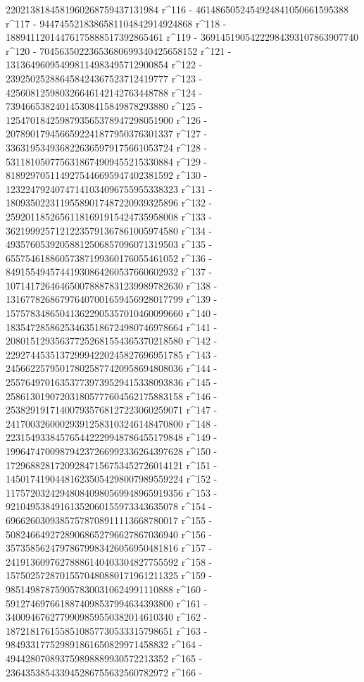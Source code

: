        2202138184581960268759437131984 r^116 - 
       4614865052454924841050661595388 r^117 - 
       9447455218386581104842914924868 r^118 - 
       18894112014476175888517392865461 r^119 - 
       36914519054222984393107863907740 r^120 - 
       70456350223653680699340425658152 r^121 - 
       131364960954998114983495712900854 r^122 - 
       239250252886458424367523712419777 r^123 - 
       425608125980326646142142763448788 r^124 - 
       739466538240145308415849878293880 r^125 - 
       1254701842598793565378947298051900 r^126 - 
       2078901794566592241877950376301337 r^127 - 
       3363195349368226365979175661053724 r^128 - 
       5311810507756318674909455215330884 r^129 - 
       8189297051149275446695947402381592 r^130 - 
       12322479240747141034096755955338323 r^131 - 
       18093502231195589017487220939325896 r^132 - 
       25920118526561181691915424735958008 r^133 - 
       36219992571212235791367861005974580 r^134 - 
       49357605392058812506857096071319503 r^135 - 
       65575461886057387199360176055461052 r^136 - 
       84915549457441930864260537660602932 r^137 - 
       107141726464650078887831239989782630 r^138 - 
       131677826867976407001659456928017799 r^139 - 
       157578348650413622905357010460099660 r^140 - 
       183547285862534635186724980746978664 r^141 - 
       208015129356377252681554365370218580 r^142 - 
       229274453513729994220245827696951785 r^143 - 
       245662257950178025877420958694808036 r^144 - 
       255764970163537739739529415338093836 r^145 - 
       258613019072031805777604562175883158 r^146 - 
       253829191714007935768127223060259071 r^147 - 
       241700326000293912583103246148470800 r^148 - 
       223154933845765442229948786455179848 r^149 - 
       199647470098794237266992336264397628 r^150 - 
       172968828172092847156753452726014121 r^151 - 
       145017419044816235054298007989559224 r^152 - 
       117572032429480840980569948965919356 r^153 - 
       92104953849161352060155973343635078 r^154 - 
       69662603093857578708911113668780017 r^155 - 
       50824664927289068652796627867036940 r^156 - 
       35735856247978679983426056950481816 r^157 - 
       24191360976278886140403304827755592 r^158 - 
       15750257287015570480880171961211325 r^159 - 
       9851498787590578300310624991110888 r^160 - 
       5912746976618874098537994634393800 r^161 - 
       3400946762779909859550382014610340 r^162 - 
       1872181761558510857730533315798651 r^163 - 
       984933177529891861650829971458832 r^164 - 
       494428070893759898889930572213352 r^165 - 
       236435385433945286755632560782972 r^166 - 

